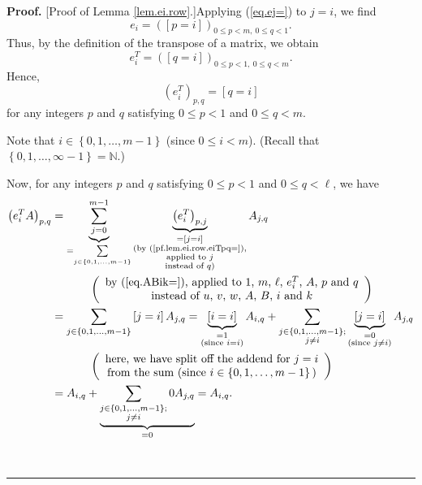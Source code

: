 \documentclass[numbers=enddot,12pt,final,onecolumn,notitlepage]{scrartcl}%
\theoremstyle{definition}
\newenvironment{proof}[1][Proof]{\noindent\textbf{#1.} }{\ \rule{0.5em}{0.5em}}
\let\sumnonlimits\sum
\renewcommand{\sum}{\sumnonlimits\limits}
\newenvironment{verlong}{}{}
\begin{document}
\begin{verlong}
\begin{proof}
[Proof of Lemma \ref{lem.ei.row}.]Applying (\ref{eq.ej=}) to $j=i$, we find%
\[
e_{i}=\left(  \left[  p=i\right]  \right)  _{0\leq p<m,\ 0\leq q<1}.
\]
Thus, by the definition of the transpose of a matrix, we obtain%
\[
e_{i}^{T}=\left(  \left[  q=i\right]  \right)  _{0\leq p<1,\ 0\leq q<m}.
\]
Hence,%
\begin{equation}
\left(  e_{i}^{T}\right)  _{p,q}=\left[  q=i\right]
\label{pf.lem.ei.row.eiTpq=}%
\end{equation}
for any integers $p$ and $q$ satisfying $0\leq p<1$ and $0\leq q<m$.

Note that $i\in\left\{  0,1,\ldots,m-1\right\}  $ (since $0\leq i<m$). (Recall
that $\left\{  0,1,\ldots,\infty-1\right\}  =\mathbb{N}$.)

Now, for any integers $p$ and $q$ satisfying $0\leq p<1$ and $0\leq q<\ell$,
we have%
\begin{align}
\left(  e_{i}^{T}A\right)  _{p,q}  &  =\underbrace{\sum_{j=0}^{m-1}}%
_{=\sum_{j\in\left\{  0,1,\ldots,m-1\right\}  }}\underbrace{\left(  e_{i}%
^{T}\right)  _{p,j}}_{\substack{=\left[  j=i\right]  \\\text{(by
(\ref{pf.lem.ei.row.eiTpq=}),}\\\text{applied to }j\\\text{instead of
}q\text{)}}}A_{j,q}\nonumber\\
&  \ \ \ \ \ \ \ \ \ \ \left(
\begin{array}
[c]{c}%
\text{by (\ref{eq.ABik=}), applied to }1\text{, }m\text{, }\ell\text{, }%
e_{i}^{T}\text{, }A\text{, }p\text{ and }q\\
\text{instead of }u\text{, }v\text{, }w\text{, }A\text{, }B\text{, }i\text{
and }k
\end{array}
\right) \nonumber\\
&  =\sum_{j\in\left\{  0,1,\ldots,m-1\right\}  }\left[  j=i\right]
A_{j,q}=\underbrace{\left[  i=i\right]  }_{\substack{=1\\\text{(since
}i=i\text{)}}}A_{i,q}+\sum_{\substack{j\in\left\{  0,1,\ldots,m-1\right\}
;\\j\neq i}}\underbrace{\left[  j=i\right]  }_{\substack{=0\\\text{(since
}j\neq i\text{)}}}A_{j,q}\nonumber\\
&  \ \ \ \ \ \ \ \ \ \ \left(
\begin{array}
[c]{c}%
\text{here, we have split off the addend for }j=i\\
\text{from the sum (since }i\in\left\{  0,1,\ldots,m-1\right\}  \text{)}%
\end{array}
\right) \nonumber\\
&  =A_{i,q}+\underbrace{\sum_{\substack{j\in\left\{  0,1,\ldots,m-1\right\}
;\\j\neq i}}0A_{j,q}}_{=0}=A_{i,q}. \label{pf.lem.ei.row.4}%
\end{align}



\end{proof}
\end{verlong}
\end{document}
